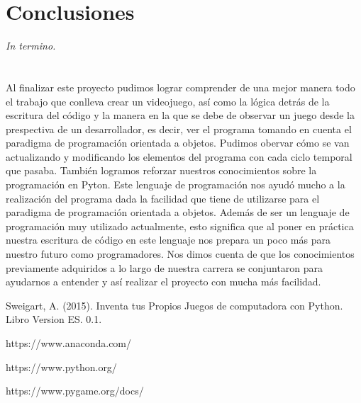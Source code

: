 \documentclass[12pt,letterpaper]{report}
\begin{document}
\chapter{Conclusiones}
\textit{In termino.} \\ \\ \\ 
Al finalizar este proyecto pudimos lograr comprender de una mejor manera todo el trabajo que conlleva crear un videojuego, así como la lógica detrás de la escritura del código y la manera en la que se debe de observar un juego desde la prespectiva de un desarrollador, es decir, ver el programa tomando en cuenta el paradigma de programación orientada a objetos. \newline\newline
Pudimos obervar cómo se van actualizando y modificando los elementos del programa con cada ciclo temporal que pasaba. \newline \newline
También logramos reforzar nuestros conocimientos sobre la programación en Pyton. Este lenguaje de programación nos ayudó mucho a la realización del programa dada la facilidad que tiene de utilizarse para el paradigma de programación orientada a objetos. Además de ser un lenguaje de programación muy utilizado actualmente, esto significa que al poner en práctica nuestra escritura de código en este lenguaje nos prepara un poco más para nuestro futuro como programadores. \newline\newline
Nos dimos cuenta de que los conocimientos previamente adquiridos a lo largo de nuestra carrera se conjuntaron para ayudarnos a entender y así realizar el proyecto con mucha más facilidad.

\begin{thebibliography}{0}

   Sweigart, A. (2015). Inventa tus Propios Juegos de computadora con Python. Libro Version ES. 0.1.
    
   https://www.anaconda.com/
  
   https://www.python.org/
  
   https://www.pygame.org/docs/  
  
  
\end{thebibliography}
\end{document}
